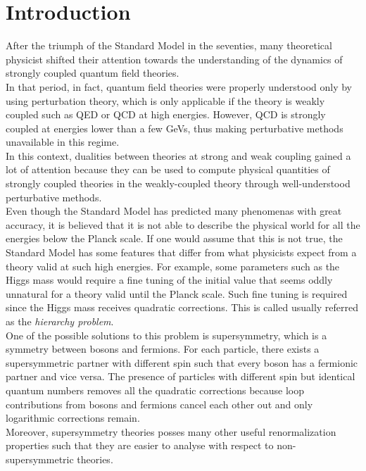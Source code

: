 \cleardoublepage
\chapter{Introduction}
After the triumph of the Standard Model in the seventies, many theoretical physicist shifted their attention towards the understanding of the dynamics of strongly coupled quantum field theories. \\
In that period, in fact, quantum field theories were properly understood only by using perturbation theory, which is only applicable if the theory is weakly coupled such as QED or QCD at high energies.
However, QCD is strongly coupled at energies lower than a few GeVs, thus making perturbative methods unavailable in this regime.
\\
In this context, dualities between theories at strong and weak coupling gained a lot of attention because they can be used to compute physical quantities of strongly coupled theories in the weakly-coupled theory through well-understood perturbative methods.
\\

Even though the Standard Model has predicted many phenomenas with great accuracy, it is believed that it is not able to describe the physical world for all the energies below the Planck scale.
If one would assume that this is not true, the Standard Model has some features that differ from what physicists expect from a theory valid at such high energies.
For example, some parameters such as the Higgs mass would require a fine tuning of the initial value that seems oddly unnatural for a theory valid until the Planck scale.
Such fine tuning is required since the Higgs mass receives quadratic corrections.
This is called usually referred as the \emph{hierarchy problem}.
\\
One of the possible solutions to this problem is supersymmetry, which is a symmetry between bosons and fermions. 
For each particle, there exists a supersymmetric partner with different spin  such that every boson has a fermionic partner and vice versa.
The presence of particles with different spin but identical quantum numbers removes all the quadratic corrections because loop contributions from bosons and fermions cancel each other out and only logarithmic corrections remain.
\\
Moreover, supersymmetry theories posses many other useful renormalization properties such that they are easier to analyse with respect to non-supersymmetric theories.\\


